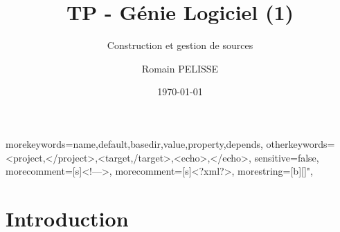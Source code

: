 \documentclass[handout]{beamer}
\title{TP - Génie Logiciel (1)}
\subtitle{Construction et gestion de sources}
\author{Romain PELISSE}
\institute{ESME Sudria}
\date{\today}
\begin{document}
	{
		morekeywords={name,default,basedir,value,property,depends},
		otherkeywords={<project,</project>,<target,/target>,<echo>,</echo>},
		sensitive=false,
		morecomment=[s]{<!--}{-->},
		morecomment=[s]{<?xml}{?>},
		morestring=[b][\color{red}]",
	}


\frame{\titlepage}

\section[Agenda]{}
\begin{frame}
	\begin{multicols}{2}
		\tableofcontents
	\end{multicols}
\end{frame}

\section{Introduction}
\end{document}
